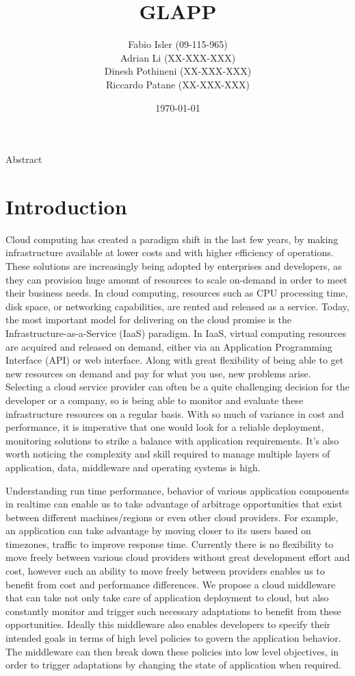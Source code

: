 \documentclass{seal_thesis}
\date{\today}
\title{GLAPP}
\subtitle{}
\author{
Fabio Isler \textmd{(09-115-965)} \\
Adrian Li \textmd{(XX-XXX-XXX)} \\
Dinesh Pothineni \textmd{(XX-XXX-XXX)} \\
Riccardo Patane \textmd{(XX-XXX-XXX)}}
\begin{document}
\maketitle

\abstract
Abstract


\chapter{Introduction}
Cloud computing has created a paradigm shift in the last few years, by making infrastructure available at lower costs and with higher efficiency of operations.
These solutions are increasingly being adopted by enterprises and developers, as they can provision huge amount of resources to scale on-demand in order to meet their business needs.
In cloud computing, resources such as CPU processing time, disk space, or networking capabilities, are rented and released as a service.
Today, the most important model for delivering on the cloud promise is the Infrastructure-as-a-Service (IaaS) paradigm.
In IaaS, virtual computing resources are acquired and released on demand, either via an Application Programming Interface (API) or web interface.
Along with great flexibility of being able to get new resources on demand and pay for what you use, new problems arise.
Selecting a cloud service provider can often be a quite challenging decision for the developer or a company, so is being able to monitor and evaluate these infrastructure resources on a regular basis.
With so much of variance in cost and performance, it is imperative that one would look for a reliable deployment, monitoring solutions to strike a balance with application requirements.
It's also worth noticing the complexity and skill required to manage multiple layers of application, data, middleware and operating systems is high.

Understanding run time performance, behavior of various application components in realtime can enable us to take advantage of arbitrage opportunities that exist between different machines/regions or even other cloud providers.
For example, an application can take advantage by moving closer to its users based on timezones, traffic to improve response time.
Currently there is no flexibility to move freely between various cloud providers without great development effort and cost, however such an ability to move freely between providers enables us to benefit from cost and performance differences.
We propose a cloud middleware that can take not only take care of application deployment to cloud, but also constantly monitor and trigger such necessary adaptations to benefit from these opportunities.
Ideally this middleware also enables developers to specify their intended goals in terms of high level policies to govern the application behavior.
The middleware can then break down these policies into low level objectives, in order to trigger adaptations by changing the state of application when required.
\end{document}
